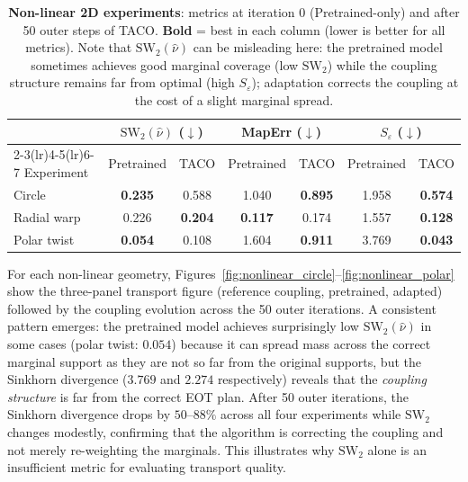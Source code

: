 \documentclass[11pt]{article}
\theoremstyle{definition}
\numberwithin{equation}{section}%
\begin{document}
\begin{table}[ht]
\centering
\caption{\textbf{Non-linear 2D experiments}: metrics at iteration 0 (Pretrained-only)
  and after 50 outer steps of TACO.
  \textbf{Bold} = best in each column (lower is better for all metrics).
  Note that $\mathrm{SW}_2(\hat\nu)$ can be misleading here: the pretrained
  model sometimes achieves good marginal coverage (low $\mathrm{SW}_2$) while
  the coupling structure remains far from optimal (high $S_\varepsilon$);
  adaptation corrects the coupling at the cost of a slight marginal spread.}
\label{tab:nonlinear_results}
\vspace{2pt}
\setlength{\tabcolsep}{5pt}
\begin{tabular}{lcccccc}
\toprule
 & \multicolumn{2}{c}{$\mathrm{SW}_2(\hat\nu)$ ($\downarrow$)} & \multicolumn{2}{c}{MapErr ($\downarrow$)} & \multicolumn{2}{c}{$S_\varepsilon$ ($\downarrow$)} \\
\cmidrule(lr){2-3}\cmidrule(lr){4-5}\cmidrule(lr){6-7}
Experiment & Pretrained & TACO & Pretrained & TACO & Pretrained & TACO \\
\midrule
Circle       & \textbf{0.235} & 0.588 & 1.040 & \textbf{0.895} & 1.958 & \textbf{0.574} \\
Radial warp  & 0.226 & \textbf{0.204} & \textbf{0.117} & 0.174          & 1.557 & \textbf{0.128} \\
Polar twist  & \textbf{0.054} & 0.108 & 1.604 & \textbf{0.911} & 3.769 & \textbf{0.043} \\
\bottomrule
\end{tabular}
\end{table}

For each non-linear geometry, Figures~\ref{fig:nonlinear_circle}--\ref{fig:nonlinear_polar} show the three-panel transport figure (reference coupling, pretrained, adapted) followed by the coupling evolution across the 50 outer iterations.
A consistent pattern emerges: the pretrained model achieves surprisingly low
$\mathrm{SW}_2(\hat\nu)$ in some cases (polar twist: $0.054$)
because it can spread mass across the correct marginal support as they are not so far from the original supports,
but the Sinkhorn divergence ($3.769$ and $2.274$ respectively) reveals that
the \emph{coupling structure} is far from the correct EOT plan.
After 50 outer iterations, the Sinkhorn divergence drops by $50$--$88\%$
across all four experiments while $\mathrm{SW}_2$ changes modestly,
confirming that the algorithm is correcting the coupling and not
merely re-weighting the marginals.
This illustrates why $\mathrm{SW}_2$ alone is an insufficient metric for
evaluating transport quality.
\end{document}

